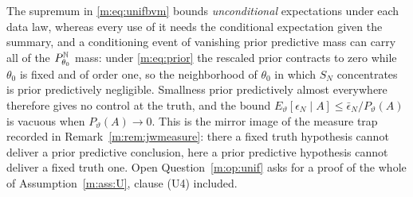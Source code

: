 \begin{remark}\label{m:rem:u4}
The supremum in \eqref{m:eq:unifbvm} bounds \emph{unconditional} expectations under each data law, whereas every use of it needs the conditional expectation given the summary, and a conditioning event of vanishing prior predictive mass can carry all of the $P^{\mathbb{N}}_{\theta_0}$ mass: under \eqref{m:eq:prior} the rescaled prior contracts to zero while $\theta_0$ is fixed and of order one, so the neighborhood of $\theta_0$ in which $S_N$ concentrates is prior predictively negligible. Smallness prior predictively almost everywhere therefore gives no control at the truth, and the bound $E_\vartheta[\epsilon_N\mid A]\le\bar\epsilon_N/P_\vartheta(A)$ is vacuous when $P_\vartheta(A)\to0$. This is the mirror image of the measure trap recorded in Remark~\ref{m:rem:jwmeasure}: there a fixed truth hypothesis cannot deliver a prior predictive conclusion, here a prior predictive hypothesis cannot deliver a fixed truth one. Open Question~\ref{m:op:unif} asks for a proof of the whole of Assumption~\ref{m:ass:U}, clause (U4) included.
\end{remark}

